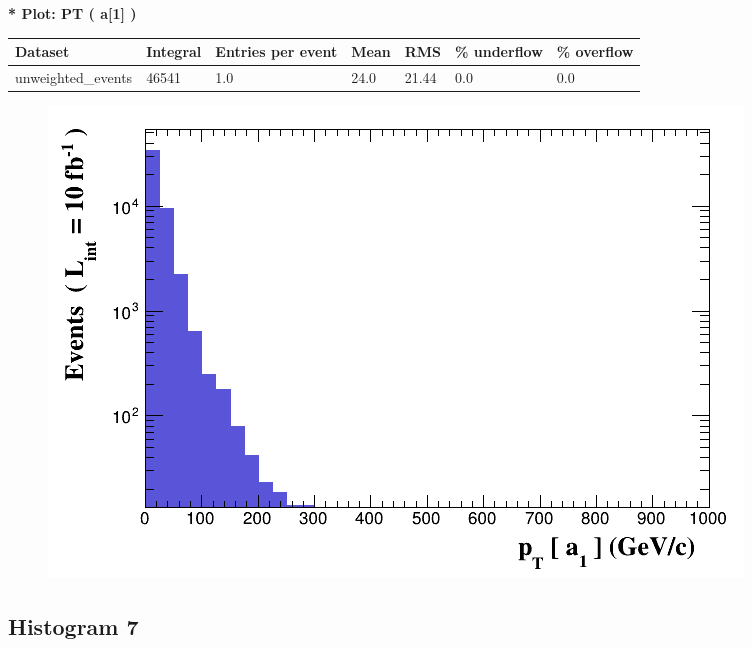 \documentclass[a4paper, 10pt]{article}
\begin{document}
\textbf{* Plot: PT ( a[1] ) }\\
   \begin{table}[H]
  \begin{center}
    \begin{tabular}{|m{23.0mm}|m{23.0mm}|m{18.0mm}|m{19.0mm}|m{19.0mm}|m{19.0mm}|m{19.0mm}|}
      \hline
      {\cellcolor{yellow}         Dataset}& {\cellcolor{yellow}         Integral}& {\cellcolor{yellow}         Entries per event}& {\cellcolor{yellow}         Mean}& {\cellcolor{yellow}         RMS}& {\cellcolor{yellow}         \% underflow}& {\cellcolor{yellow}         \% overflow}\\
      \hline
      {\cellcolor{white}         unweighted\_events}& {\cellcolor{white}         46541}& {\cellcolor{white}         1.0}& {\cellcolor{white}         24.0}& {\cellcolor{white}         21.44}& {\cellcolor{green}         0.0}& {\cellcolor{green}         0.0}\\
\hline
    \end{tabular}
  \end{center}
\end{table}

\begin{figure}[H]
  \begin{center}
    \includegraphics[scale=0.45]{selection_5.png}\\
\caption{   }
  \end{center}
\end{figure}
      \newpage
\subsection{ Histogram 7}
\end{document}
